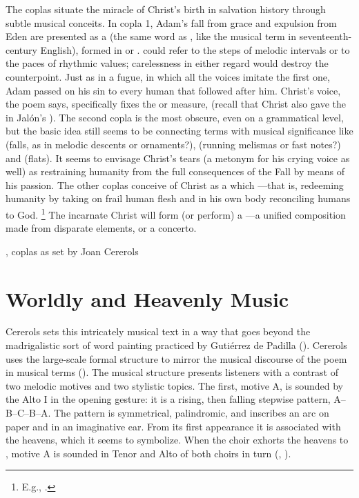 The coplas situate the miracle of Christ's birth in salvation history through
subtle musical conceits.
In copla 1, Adam's fall from grace and expulsion from Eden are presented as a
 (the same word as , like the musical term
 in seventeenth-century English), formed in 
or . 
 could refer to the steps of melodic intervals or to the paces
of rhythmic values; carelessness in either regard would destroy the
counterpoint.
Just as in a fugue, in which all the voices imitate the first one, Adam passed
on his sin to every human that followed after him.
Christ's voice, the poem says, specifically fixes the  or measure,
 (recall that Christ also gave the
 in Jalón's ).
The second copla is the most obscure, even on a grammatical level, but the basic
idea still seems to be connecting terms with musical significance like
 (falls, as in melodic descents or ornaments?), 
(running melismas or fast notes?) and  (flats).
It seems to envisage Christ's tears (a metonym for his crying voice as well) as
restraining humanity from the full consequences of the Fall by means of his
passion.
The other coplas conceive of Christ as a  which
---that is, redeeming
humanity by taking on frail human flesh and in his own body reconciling humans
to God.%
    \footnote{E.g., .}
The incarnate Christ will form (or perform) a ---a unified
composition made from disparate elements, or a concerto.

{, coplas as set by Joan Cererols}


\section{Worldly and Heavenly Music}

Cererols sets this intricately musical text in a way that goes beyond the
madrigalistic sort of word painting practiced by Gutiérrez de Padilla
().
Cererols uses the large-scale formal structure to mirror the musical discourse
of the poem in musical terms ().
The musical structure presents listeners with a contrast of two melodic motives
and two stylistic topics.
The first, motive A, is sounded by the Alto I in the opening gesture: it is a
rising, then falling stepwise pattern, A--B--C--B--A.
The pattern is symmetrical, palindromic, and inscribes an arc on paper and in an
imaginative ear.
From its first appearance it is associated with the heavens, which it seems to
symbolize.
When the choir exhorts the heavens to , motive A is
sounded in Tenor and Alto of both choirs in turn (,
).

